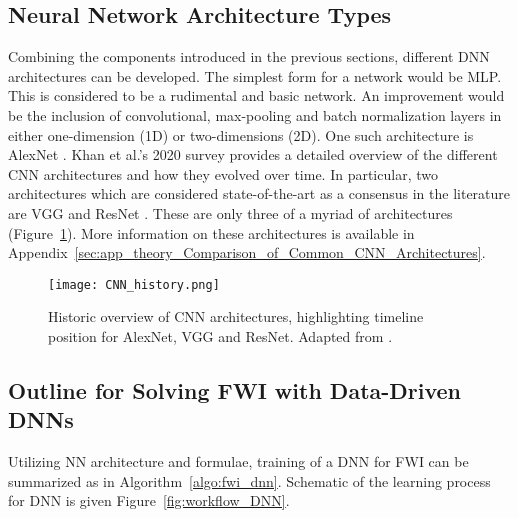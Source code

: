 \subsection{Neural Network Architecture Types}\label{sec:theory_NN_arch_types}
Combining the components introduced in the previous sections, different DNN architectures can be developed. The simplest form for a network would be MLP. This is considered to be a rudimental and basic network. An improvement would be the inclusion of convolutional, max-pooling and batch normalization layers in either one-dimension (1D) or two-dimensions (2D). One such architecture is AlexNet \citep{Krizhevsky2012}. Khan et al.’s 2020 survey provides a detailed overview of the different CNN architectures and how they evolved over time. In particular, two architectures which are considered state-of-the-art as a consensus in the literature are VGG \citep{Simonyan2014} and ResNet \citep{He2016IEEE}. These are only three of a myriad of architectures (Figure~\ref{fig:CNN_history}). More information on these architectures is available in Appendix~\ref{sec:app_theory_Comparison_of_Common_CNN_Architectures}.
\begin{figure}[ht!]
	\centering
	\texttt{[image: CNN\_history.png]}
	\caption[Historic overview of CNN architectures]{Historic overview of CNN architectures, highlighting timeline position for AlexNet, VGG and ResNet. Adapted from \cite{Khan2020}.}
	\label{fig:CNN_history}
\end{figure}

\clearpage
\subsection{Outline for Solving FWI with Data-Driven DNNs}
Utilizing NN architecture and formulae, training of a DNN for FWI can be summarized as in Algorithm~\ref{algo:fwi_dnn}. Schematic of the learning process for DNN is given Figure~\ref{fig:workflow_DNN}.

